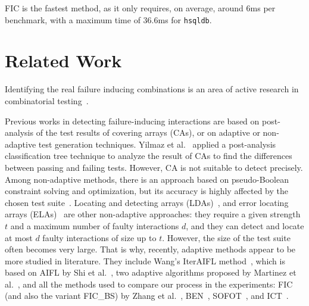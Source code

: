 \begin{tikzborder}{\cite{Gargantini16:validation}}
\begin{tikzborder}{\cite{gargantini_combinatorial_2017}}
\begin{tikzborder}{\cite{garn2019}}
\begin{tikzborder}{\cite{arcaini2019achieving}}
\begin{tikzborder}{}
FIC is the fastest method, as it only requires, on average, around 6ms per benchmark, with a maximum time of 36.6ms for \texttt{hsqldb}.

\end{tikzborder}
\section{Related Work}\label{sec:related}
\begin{tikzborder}{}	

Identifying the real failure inducing combinations is an area of active research in combinatorial testing~\cite{nie_2011, kuhn_practical_2010}.

Previous works in detecting failure-inducing interactions are based on post-analysis of the test results of covering arrays (CAs), or on adaptive or non-adaptive test generation techniques. Yilmaz et al.~\cite{CohenTSE06} applied a post-analysis classification tree technique to analyze the result of CAs to find the differences between passing and failing tests. However, CA is not suitable to detect \mfics precisely. Among non-adaptive methods, there is an approach based on pseudo-Boolean constraint solving and optimization, but its accuracy is highly affected by the chosen test suite~\cite{Zhang2012FII}.
Locating and detecting arrays (LDAs)~\cite{colbourn_locating_2008}, 
and error locating arrays (ELAs)~\cite{martinez_locating_2010} are other non-adaptive approaches: they require a given strength $t$ and a maximum number of faulty interactions $d$, and they can detect and locate at most $d$ faulty interactions of size up to $t$. However, the size of the test suite often becomes very large. That is why, recently, adaptive methods appear to be more studied in literature. They include Wang's IterAIFL method~\cite{wang_adaptive_2010}, which is based on AIFL by Shi et al.~\cite{shi_software_nodate}, two adaptive algorithms proposed by Martinez et al.~\cite{martinez_locating_2010}, and all the methods used to compare our process in the experiments: FIC (and also the variant FIC\_BS) by Zhang et al.~\cite{zhang_characterizing_2011}, BEN~\cite{ghandehari2018combinatorial}, SOFOT~\cite{nie_2011}, and ICT~\cite{Niu2018interleaving}.


\end{tikzborder}
\end{tikzborder}
\end{tikzborder}
\end{tikzborder}
\end{tikzborder}
